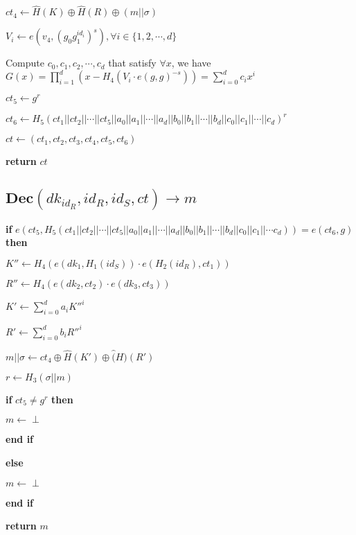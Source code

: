 \documentclass[a4paper]{article}
\begin{document}
$\textit{ct}_4 \gets \hat{H}(K) \oplus \hat{H}(R) \oplus (m || \sigma)$

$V_i \gets e(v_4, (g_0 g_1^{\textit{id}_i})^s), \forall i \in \{1, 2, \cdots, d\}$

Compute $c_0, c_1, c_2, \cdots, c_d$ that satisfy $\forall x$, we have $G(x) = \prod\limits_{i = 1}^d (x - H_4(V_i \cdot e(g, g)^{-s})) = \sum\limits_{i = 0}^d c_i x^i$

$\textit{ct}_5 \gets g^r$

$\textit{ct}_6 \gets H_5(\textit{ct}_1 || \textit{ct}_2 || \cdots || \textit{ct}_5 || a_0 || a_1 || \cdots || a_d || b_0 || b_1 || \cdots || b_d || c_0 || c_1 || \cdots || c_d)^r$

$\textit{ct} \gets (\textit{ct}_1, \textit{ct}_2, \textit{ct}_3, \textit{ct}_4, \textit{ct}_5, \textit{ct}_6)$

\textbf{return} $\textit{ct}$

\subsection{$\textbf{Dec}(\textit{dk}_{\textit{id}_R}, \textit{id}_R, \textit{id}_S, \textit{ct}) \rightarrow m$}

\textbf{if} $e(\textit{ct}_5, H_5(\textit{ct}_1 || \textit{ct}_2 || \cdots || \textit{ct}_5 || a_0 || a_1 || \cdots || a_d || b_0 || b_1 || \cdots || b_d || c_0 || c_1 || \cdots c_d)) = e(\textit{ct}_6, g)$ \textbf{then}

\quad$K'' \gets H_4(e(\textit{dk}_1, H_1(\textit{id}_S)) \cdot e(H_2(\textit{id}_R), \textit{ct}_1))$

\quad$R'' \gets H_4(e(\textit{dk}_2, \textit{ct}_2) \cdot e(\textit{dk}_3, \textit{ct}_3))$

\quad$K' \gets \sum\limits_{i = 0}^d a_i K''^i$

\quad$R' \gets \sum\limits_{i = 0}^d b_i R''^i$

\quad$m || \sigma \gets \textit{ct}_4 \oplus \hat{H}(K') \oplus \hat(H)(R')$

\quad$r \gets H_3(\sigma || m)$

\quad\textbf{if} $\textit{ct}_5 \neq g^r$ \textbf{then}

\quad\quad$m \gets \perp$

\quad\textbf{end if}

\textbf{else}

\quad$m \gets \perp$

\textbf{end if}

\textbf{return} $m$
\end{document}
